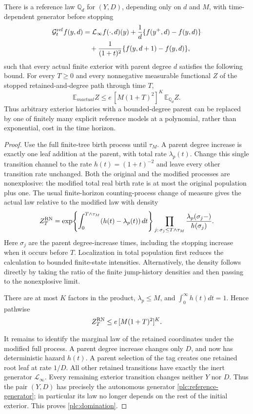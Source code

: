 \begin{theorem}
\label{plc:theorem}
There is a reference law $\mathbb Q_d$ for $(Y,D)$, depending only on
$d$ and $M$, with time-dependent generator before stopping
\begin{align}
 \mathcal G_t^{\rm ref}f(y,d)
 &=\mathcal L_\infty f(\cdot,d)(y)
   +\frac1d\{f(y^+,d)-f(y,d)\}\notag\\
 &\quad+\frac1{(1+t)^2}\{f(y,d+1)-f(y,d)\},
 \label{plc:reference-generator}
\end{align}
such that every actual finite exterior with parent degree $d$ satisfies
the following bound.  For every $T\ge0$ and every nonnegative measurable
functional $Z$ of the stopped retained-and-degree path through time $T$,
\begin{equation}\label{plc:domination}
 \mathbb E_{
m actual} Z
 \le e\,[M(1+T)^2]^K\,\mathbb E_{\mathbb Q_d} Z.
\end{equation}
Thus arbitrary exterior histories with a bounded-degree parent can be
replaced by one of finitely many explicit reference models at a
polynomial, rather than exponential, cost in the time horizon.
\end{theorem}
\begin{proof}
Use the full finite-tree birth process until $\tau_M$.  A parent degree
increase is exactly one leaf addition at the parent, with total rate
$\lambda_p(t)$.  Change this single transition channel to the rate
$h(t)=(1+t)^{-2}$ and leave every other transition rate unchanged.
Both the original and the modified processes are nonexplosive: the
modified total real birth rate is at most the original population plus
one.  The usual finite-horizon counting-process change of measure gives
the actual law relative to the modified law with density
\[
 Z_T^{\rm RN}
 =\exp\!\left\{\int_0^{T\wedge\tau_M}
                     (h(t)-\lambda_p(t))\,dt\right\}
   \prod_{j:\,\sigma_j\le T\wedge\tau_M}
        \frac{\lambda_p(\sigma_j-)}{h(\sigma_j)}.
\]
Here $\sigma_j$ are the parent degree-increase times, including the
stopping increase when it occurs before $T$.  Localization in total
population first reduces the calculation to bounded finite-state
intensities.  Alternatively, the density follows directly by taking
the ratio of the finite jump-history densities and then passing to the
nonexplosive limit.

There are at most $K$ factors in the product,
$\lambda_p\le M$, and $\int_0^\infty h(t)dt=1$.  Hence pathwise
\[
 Z_T^{\rm RN}\le e\,[M(1+T)^2]^K.
\]

It remains to identify the marginal law of the retained coordinates
under the modified full process.  A parent degree increase changes only
$D$, and now has deterministic hazard $h(t)$.  A parent selection of the
tag creates one retained root leaf at rate $1/D$.  All other retained
transitions have exactly the inert generator $\mathcal L_\infty$.
Every remaining exterior transition changes neither $Y$ nor $D$.
Thus the pair $(Y,D)$ has precisely the autonomous generator
\eqref{plc:reference-generator}; in particular its law no longer depends
on the rest of the initial exterior.  This proves
\eqref{plc:domination}.
\end{proof}

